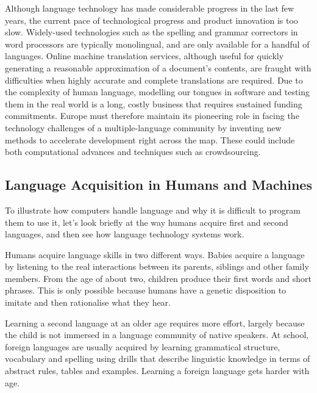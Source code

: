 \begin{multicols}{2}
    Although language technology has made considerable progress in the last few years, the current pace of technological progress and product innovation is too slow. 
Widely-used technologies such as the spelling and grammar correctors in word processors are typically monolingual, and are only available for a handful of languages. Online machine translation services, although useful for quickly generating a reasonable approximation of a document’s contents, are fraught with difficulties when highly accurate and complete translations are required. Due to the complexity of human language, modelling our tongues in software and testing them in the real world is a long, costly business that requires sustained funding commitments. Europe must therefore maintain its pioneering role in facing the technology challenges of a multiple-language community by inventing new methods to accelerate development right across the map. These could include both computational advances and techniques such as crowdsourcing.


\subsection{Language Acquisition in Humans and Machines}

    To illustrate how computers handle language and why it is difficult to program them to use it, let’s look briefly at the way humans acquire first and second languages, and then see how language technology systems work. 

    Humans acquire language skills in two different ways. Babies acquire a language by listening to the real interactions between its parents, siblings and other family members. From the age of about two, children produce their first words and short phrases. This is only possible because humans have a genetic disposition to imitate and then rationalise what they hear. 

    Learning a second language at an older age requires more effort, largely because the child is not immersed in a language community of native speakers. At school, foreign languages are usually acquired by learning grammatical structure, vocabulary and spelling using drills that describe linguistic knowledge in terms of abstract rules, tables and examples. Learning a foreign language gets harder with age.


\end{multicols}
